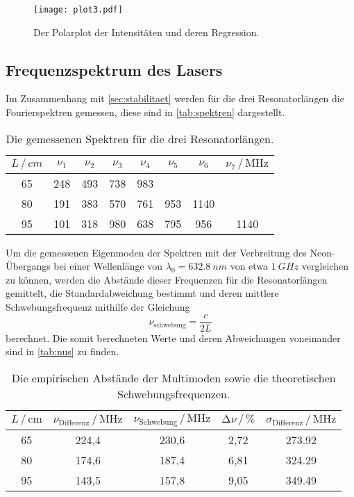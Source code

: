 \begin{figure}[H]
    \centering
    \texttt{[image: plot3.pdf]}
    \caption{Der Polarplot der Intensitäten und deren Regression.}
    \label{fig:plot3}
\end{figure}


\subsection{Frequenzspektrum des Lasers} \label{sec:spektrum}
Im Zusammenhang mit \autoref{sec:stabilitaet} werden für die drei Resonatorlängen die Fourierspektren gemessen,
diese sind in \autoref{tab:spektren} dargestellt.
\begin{table}
    \centering
    \caption{Die gemessenen Spektren für die drei Resonatorlängen.}
    \label{tab:spektren}
    \begin{tabular}{c c c c c c c c}
        \toprule
        $L \, / \, cm$ & $\nu_1$ & $\nu_2$ & $\nu_3$ & $\nu_4$ & $\nu_5$ & $\nu_6$ & $\nu_7  \, / \, \unit{\mega\hertz}$\\
        \midrule
           65 &  248 &  493 &  738 &  983 &       &        &        \\
           80 &  191 &  383 &  570 &  761 & 953 & 1140 &        \\
           95 &  101 &  318 &  980 &  638 & 795 &  956 & 1140 \\
        \bottomrule
    \end{tabular}
\end{table}

Um die gemessenen Eigenmoden der Spektren mit der Verbreitung des Neon-Übergangs bei einer Wellenlänge von $\lambda_0 = \qty{632.8}{nm}$ 
von etwa $\qty{1}{GHz}$ vergleichen zu können,
werden die Abstände dieser Frequenzen für die Resonatorlängen gemittelt, 
die Standardabweichung bestimmt
und deren mittlere Schwebungsfrequenz mithilfe der Gleichung
\begin{equation*}
    \nu_{\text{schwebung}} = \frac{c}{2L} 
\end{equation*}
berechnet. 
Die somit berechneten Werte und deren Abweichungen voneinander sind in \autoref{tab:nus} zu finden.
\begin{table}
    \centering
    \caption{Die empirischen Abstände der Multimoden sowie die theoretischen Schwebungsfrequenzen.}
    \label{tab:nus}
    \begin{tabular}{c c c c c}
        \toprule
        $L \, / \, \mathrm{cm}$ & 
        $\bar{\nu}_\text{Differenz} \, / \, \unit{\mega\hertz}$ & 
        $\nu_{\text{Schwebung}} \, / \, \unit{\mega\hertz}$ &
        $\increment \nu  \, / \, \unit{\percent}$ &
        $\sigma_\text{Differenz} \, / \, \unit{\mega\hertz}$ \\
        \midrule
           65 & 224,4 &  230,6 & 2,72 & 273.92 \\
           80 & 174,6 &  187,4 & 6,81 & 324.29 \\ 
           95 & 143,5 &  157,8 & 9,05 & 349.49 \\
        \bottomrule
    \end{tabular}
\end{table}

